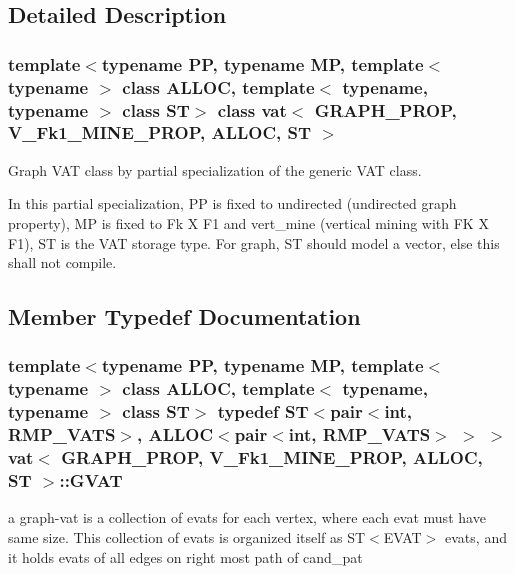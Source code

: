 \subsection{Detailed Description}
\subsubsection*{template$<$typename PP, typename MP, template$<$ typename $>$ class ALLOC, template$<$ typename, typename $>$ class ST$>$ class vat$<$ GRAPH\_\-PROP, V\_\-Fk1\_\-MINE\_\-PROP, ALLOC, ST $>$}

Graph VAT class by partial specialization of the generic VAT class. 

In this partial specialization, PP is fixed to undirected (undirected graph property), MP is fixed to Fk X F1 and vert\_\-mine (vertical mining with FK X F1), ST is the VAT storage type. For graph, ST should model a vector, else this shall not compile. 



\subsection{Member Typedef Documentation}
\subsubsection{\setlength{\rightskip}{0pt plus 5cm}template$<$typename PP, typename MP, template$<$ typename $>$ class ALLOC, template$<$ typename, typename $>$ class ST$>$ typedef ST$<$pair$<$int, RMP\_\-VATS$>$, ALLOC$<$pair$<$int, RMP\_\-VATS$>$ $>$ $>$ \bf{vat}$<$ GRAPH\_\-PROP, V\_\-Fk1\_\-MINE\_\-PROP, ALLOC, ST $>$::\bf{GVAT}}\label{classvat_3_01GRAPH__PROP_00_01V__Fk1__MINE__PROP_00_01ALLOC_00_01ST_01_4_a7791a2ed8c66de000e607d83f541c6b}


a graph-vat is a collection of evats for each vertex, where each evat must have same size. This collection of evats is organized itself as ST$<$EVAT$>$ evats, and it holds evats of all edges on right most path of cand\_\-pat 
